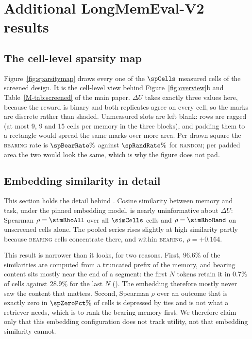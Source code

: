 \section{Additional LongMemEval-V2 results}
\label{sec:lmresults}

\subsection{The cell-level sparsity map}
\label{sec:sparsitymap}
Figure~\ref{fig:sparsitymap} draws every one of the $\spCells$ measured cells
of the screened design. It is the cell-level view behind
Figure~\ref{fig:overview}b and Table~\ref*{M-tab:screened} of the main paper.
$\Delta U$ takes exactly three values here, because the reward is binary and
both replicates agree on every cell, so the marks are discrete rather than
shaded. Unmeasured slots are left blank: rows are ragged (at most 9, 9 and 15
cells per memory in the three blocks), and padding them to a rectangle would
spread the same marks over more area. Per drawn square the \textsc{bearing}
rate is $\spBearRate\%$ against $\spRandRate\%$ for \textsc{random}; per padded
area the two would look the same, which is why the figure does not pad.


\subsection{Embedding similarity in detail}
\label{sec:simdetail}
This section holds the detail behind . Cosine similarity between memory and task, under the pinned embedding model,
is nearly uninformative about $\Delta U$: Spearman $\rho=\simRhoAll$ over all
$\simCells$ cells and $\rho=\simRhoRand$ on unscreened cells alone. The pooled series rises slightly at high
similarity partly because \textsc{bearing} cells concentrate there, and within
\textsc{bearing}, $\rho = +0.164$.

This result is narrower than it looks, for two reasons. First, 96.6\% of the
similarities are computed from a truncated prefix of the memory, and bearing
content sits mostly near the end of a segment: the first $N$ tokens retain it
in 0.7\% of cells against 28.9\% for the last $N$ ().
The embedding therefore mostly never saw the content that matters. Second,
Spearman $\rho$ over an outcome that is exactly zero in $\spZeroPct\%$ of cells
is depressed by ties and is not what a retriever needs, which is to rank the
bearing memory first. We therefore claim only that this embedding
configuration does not track utility, not that embedding similarity cannot.

